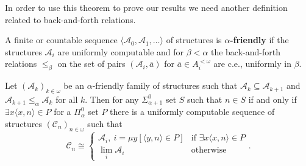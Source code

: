 \documentclass{amsart}
\newcommand\+[1]{\mathcal{#1}}
\renewcommand\*[1]{\mathbf{#1}}
\renewcommand\=[1]{\text{#1}}
\renewcommand\*[1]{\mathbf{#1}}
\newcommand{\A}{\mathcal{A}}
\newcommand{\ol}[1]{\overline{#1}}
\newcommand{\mc}[1]{\mathcal{#1}}
\newcommand{\define}[1]{\textbf{#1}}
\begin{document}
In order to use this theorem to prove our results we need another definition related to back-and-forth relations.
\begin{definition}\label{def:alphafriendly}
A finite or countable sequence $\langle \A_0,\A_1,\dots \rangle$ of structures is \define{$\alpha$-friendly} if the structures $\A_i$ are uniformly computable and for $\beta<\alpha$ the back-and-forth relations $\leq_\beta$ on the set of pairs $(\A_i, \ol a)$ for $\ol a\in A_i^{<\omega}$ are c.e., uniformly in $\beta$.
\end{definition}


\begin{lemma}\label{thm:alphalimit}
Let $( \mc A_k )_{k\in \omega}$ be an $\alpha$-friendly family of structures such that $\mc A_k\subseteq \mc A_{k+1}$ and $\mc A_{k+1}\leq_{\alpha} \mc A_k$ for all $k$. Then for any $\Sigma_{\alpha+1}^0$ set $S$ such that $n\in S$ if and only if $\exists x \langle x,n\rangle \in P$ for a $\Pi_{\alpha}^0$ set $P$ there is a uniformly computable sequence of structures $(\mc C_n)_{n\in \omega}$ such that
\[ \mc C_n \cong \begin{cases} \mc A_i,\ i =\mu y[\langle y,n\rangle \in P] & \text{if } \exists x \langle x,n\rangle \in P\\
\lim_i \mc A_i & \text{otherwise}
\end{cases}.\]
\end{lemma}
\end{document}
